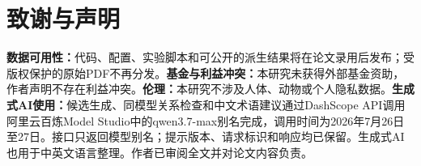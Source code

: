 \documentclass[conference,a4paper]{IEEEtran}
\begin{document}
\section*{致谢与声明}

\textbf{数据可用性：}代码、配置、实验脚本和可公开的派生结果将在论文录用后发布；受版权保护的原始PDF不再分发。\textbf{基金与利益冲突：}本研究未获得外部基金资助，作者声明不存在利益冲突。\textbf{伦理：}本研究不涉及人体、动物或个人隐私数据。\textbf{生成式AI使用：}候选生成、同模型关系检查和中文术语建议通过DashScope API调用阿里云百炼Model Studio中的\mbox{qwen3.7-max}别名完成，调用时间为2026年7月26日至27日。接口只返回模型别名；提示版本、请求标识和响应均已保留。生成式AI也用于中英文语言整理。作者已审阅全文并对论文内容负责。



\end{document}
